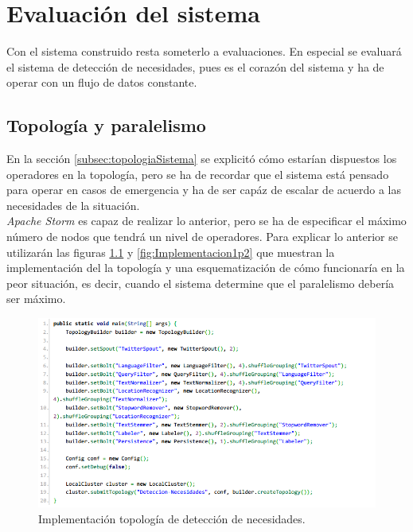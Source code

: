 \chapter{Evaluación del sistema}
\label{cap:experimentos}

Con el sistema construido resta someterlo a evaluaciones. En especial se evaluará el sistema de detección de necesidades, pues es el corazón del sistema y ha de operar con un flujo de datos constante.

\section{Topología y paralelismo}
\label{sec:topYPar}

En la sección \ref{subsec:topologiaSistema} se explicitó cómo estarían dispuestos los operadores en la topología, pero se ha de recordar que el sistema está pensado para operar en casos de emergencia y ha de ser capáz de escalar de acuerdo a las necesidades de la situación.\\

\textit{Apache Storm} es capaz de realizar lo anterior, pero se ha de especificar el máximo número de nodos que tendrá un nivel de operadores. Para explicar lo anterior se utilizarán las figuras \ref{fig:Implementacion1} y \ref{fig:Implementacion1p2} que muestran la implementación del la topología y una esquematización de cómo funcionaría en la peor situación, es decir, cuando el sistema determine que el paralelismo debería ser máximo.

\begin{figure}[H]
	\centering
	\captionsetup{justification=centering}
	\includegraphics[scale=0.8]{images/ImplementacionTopologia1.png}
	\caption[Implementación topología de detección de necesidades.]{Implementación topología de detección de necesidades.}
	\label{fig:Implementacion1}
\end{figure}

